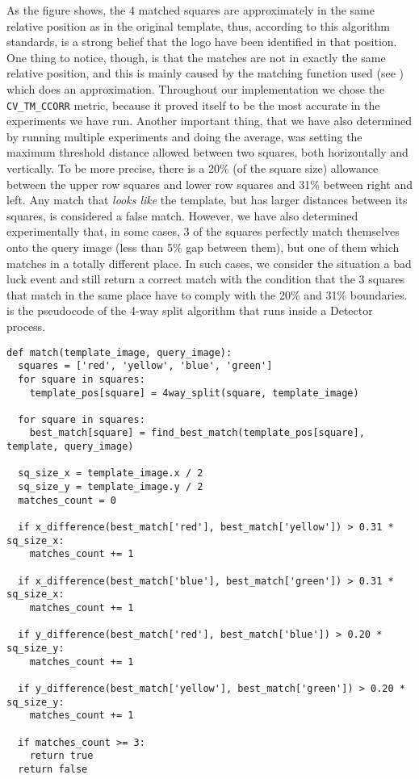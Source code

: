 As the figure shows, the 4 matched squares are approximately in the same
relative position as in the original template, thus, according to this
algorithm standards, is a strong belief that the logo have been identified in
that position. One thing to notice, though, is that the matches are not in
exactly the same relative position, and this is mainly caused by the matching
function used (see ) which
does an approximation. Throughout our implementation we chose the
\texttt{CV_TM_CCORR} metric, because it proved itself to be the most accurate
in the experiments we have run. Another important thing, that we have also
determined by running multiple experiments and doing the average, was setting
the maximum threshold distance allowed between two squares, both horizontally
and vertically. To be more precise, there is a 20\% (of the square size)
allowance between the upper row squares and lower row squares and 31\% between
right and left. Any match that \textit{looks like} the template, but has
larger distances between its squares, is considered a false match. However, we
have also determined experimentally that, in some cases, 3 of the squares
perfectly match themselves onto the query image (less than 5\% gap between
them), but one of them which matches in a totally different place. In such
cases, we consider the situation a bad luck event and still return a correct
match with the condition that the 3 squares that match in the same place have
to comply with the 20\% and 31\% boundaries.
 is the pseudocode of
the 4-way split algorithm that runs inside a Detector process.

\lstset{language=Python,caption=4 way splitting template matching algorithm,label=lst:4-way-alg}
\begin{lstlisting}
def match(template_image, query_image):
  squares = ['red', 'yellow', 'blue', 'green']
  for square in squares:
    template_pos[square] = 4way_split(square, template_image)

  for square in squares:
    best_match[square] = find_best_match(template_pos[square], template, query_image)

  sq_size_x = template_image.x / 2
  sq_size_y = template_image.y / 2
  matches_count = 0

  if x_difference(best_match['red'], best_match['yellow']) > 0.31 * sq_size_x:
    matches_count += 1

  if x_difference(best_match['blue'], best_match['green']) > 0.31 * sq_size_x:
    matches_count += 1

  if y_difference(best_match['red'], best_match['blue']) > 0.20 * sq_size_y:
    matches_count += 1

  if y_difference(best_match['yellow'], best_match['green']) > 0.20 * sq_size_y:
    matches_count += 1

  if matches_count >= 3:
    return true
  return false
\end{lstlisting}

